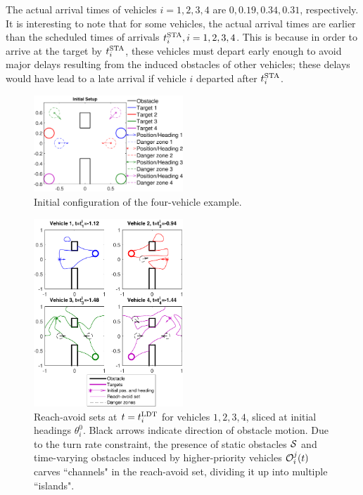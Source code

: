 The actual arrival times of vehicles $i=1,2,3,4$ are $0, 0.19, 0.34, 0.31$, respectively. It is interesting to note that for some vehicles, the actual arrival times are earlier than the scheduled times of arrivals $t^\text{STA}_i, i=1,2,3,4$. This is because in order to arrive at the target by $t^\text{STA}_i$, these vehicles must depart early enough to avoid major delays resulting from the induced obstacles of other vehicles; these delays would have lead to a late arrival if vehicle $i$ departed after $t^\text{STA}_i$.

\begin{figure}
	\centering
	\includegraphics[width=0.5\textwidth]{"fig/dubins_ic"}
	\caption{Initial configuration of the four-vehicle example.}
	\label{fig:dubins_ic}
\end{figure}

\begin{figure}
	\centering
	\includegraphics[width=0.5\textwidth]{"fig/dubins_reach_all"}
	\caption{Reach-avoid sets at $t=t^\text{LDT}_i$ for vehicles $1,2,3,4$, sliced at initial headings $\theta_i^0$. Black arrows indicate direction of obstacle motion. Due to the turn rate constraint, the presence of static obstacles $\mathcal{S}$ and time-varying obstacles induced by higher-priority vehicles $\mathcal{O}_i^j(t)$ carves ``channels" in the reach-avoid set, dividing it up into multiple ``islands".}
	\label{fig:dubins_reach_all}
\end{figure}


